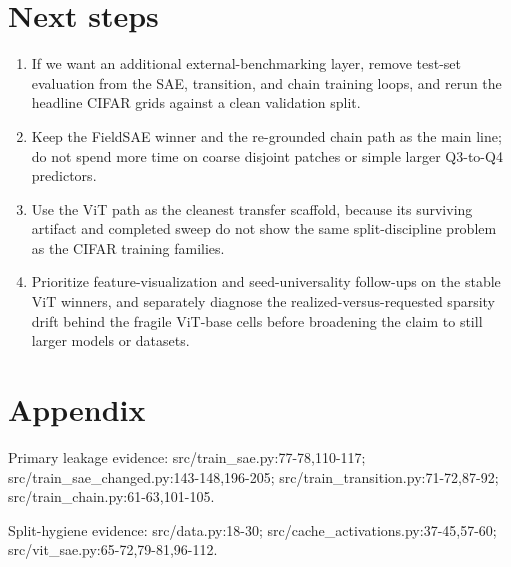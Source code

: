 \documentclass[11pt]{article}
\begin{document}
\section{Next steps}
\begin{enumerate}
\item If we want an additional external-benchmarking layer, remove test-set evaluation from the SAE, transition, and chain training loops, and rerun the headline CIFAR grids against a clean validation split.
\item Keep the FieldSAE winner and the re-grounded chain path as the main line; do not spend more time on coarse disjoint patches or simple larger Q3-to-Q4 predictors.
\item Use the ViT path as the cleanest transfer scaffold, because its surviving artifact and completed sweep do not show the same split-discipline problem as the CIFAR training families.
\item Prioritize feature-visualization and seed-universality follow-ups on the stable ViT winners, and separately diagnose the realized-versus-requested sparsity drift behind the fragile ViT-base cells before broadening the claim to still larger models or datasets.
\end{enumerate}
\section{Appendix}
Primary leakage evidence: src/train\_sae.py:77-78,110-117; src/train\_sae\_changed.py:143-148,196-205; src/train\_transition.py:71-72,87-92; src/train\_chain.py:61-63,101-105.


Split-hygiene evidence: src/data.py:18-30; src/cache\_activations.py:37-45,57-60; src/vit\_sae.py:65-72,79-81,96-112.
\end{document}
